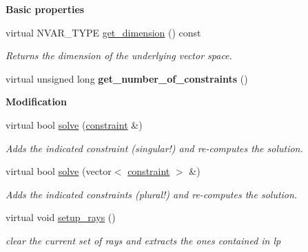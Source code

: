 \begin{Indent}\textbf{ Basic properties}\par
\begin{DoxyCompactItemize}
\item 
\mbox{\label{class_p_p_l___solver_a40b49fb3bb0b14cc66cabf54ef17e437}} 
virtual N\+V\+A\+R\+\_\+\+T\+Y\+PE \hyperlink{class_p_p_l___solver_a40b49fb3bb0b14cc66cabf54ef17e437}{get\+\_\+dimension} () const
\begin{DoxyCompactList}\small\item\em Returns the dimension of the underlying vector space. \end{DoxyCompactList}\item 
\mbox{\label{class_p_p_l___solver_a7d09fe31148950d46219df67719aef3f}} 
virtual unsigned long {\bfseries get\+\_\+number\+\_\+of\+\_\+constraints} ()
\end{DoxyCompactItemize}
\end{Indent}
\begin{Indent}\textbf{ Modification}\par
\begin{DoxyCompactItemize}
\item 
virtual bool \hyperlink{class_p_p_l___solver_a1ff16def22c734348c626b65437dd1e3}{solve} (\hyperlink{classconstraint}{constraint} \&)
\begin{DoxyCompactList}\small\item\em Adds the indicated constraint (singular!) and re-\/computes the solution. \end{DoxyCompactList}\item 
virtual bool \hyperlink{class_p_p_l___solver_a5000b8c5bee37029276ce63a3568bfb7}{solve} (vector$<$ \hyperlink{classconstraint}{constraint} $>$ \&)
\begin{DoxyCompactList}\small\item\em Adds the indicated constraints (plural!) and re-\/computes the solution. \end{DoxyCompactList}\item 
\mbox{\label{class_p_p_l___solver_a00076ee1e8ef90f7d162f02372529666}} 
virtual void \hyperlink{class_p_p_l___solver_a00076ee1e8ef90f7d162f02372529666}{setup\+\_\+rays} ()
\begin{DoxyCompactList}\small\item\em clear the current set of rays and extracts the ones contained in lp \end{DoxyCompactList}\end{DoxyCompactItemize}
\end{Indent}
